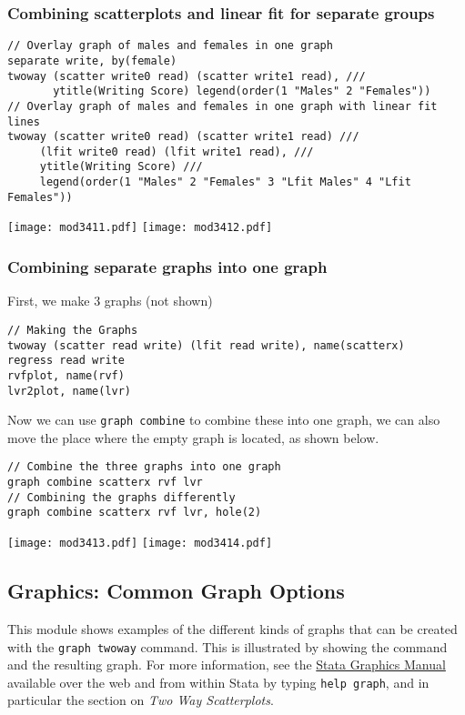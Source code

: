 \subsubsection{Combining scatterplots and linear fit for separate groups}

\begin{lstlisting}
// Overlay graph of males and females in one graph
separate write, by(female)
twoway (scatter write0 read) (scatter write1 read), ///
       ytitle(Writing Score) legend(order(1 "Males" 2 "Females"))
// Overlay graph of males and females in one graph with linear fit lines
twoway (scatter write0 read) (scatter write1 read) ///
     (lfit write0 read) (lfit write1 read), ///
     ytitle(Writing Score) ///
     legend(order(1 "Males" 2 "Females" 3 "Lfit Males" 4 "Lfit Females"))
\end{lstlisting}
\begin{center}
\texttt{[image: mod3411.pdf]}
\texttt{[image: mod3412.pdf]}
\end{center}

\subsubsection{Combining separate graphs into one graph}
First, we make 3 graphs (not shown)
\begin{lstlisting}
// Making the Graphs
twoway (scatter read write) (lfit read write), name(scatterx)
regress read write
rvfplot, name(rvf)
lvr2plot, name(lvr)
\end{lstlisting}

Now we can use \lstinline{graph combine} to combine these into one graph, we can also move the place where the empty graph is located, as shown below.

\begin{lstlisting}
// Combine the three graphs into one graph
graph combine scatterx rvf lvr
// Combining the graphs differently
graph combine scatterx rvf lvr, hole(2)
\end{lstlisting}
\begin{center}
\texttt{[image: mod3413.pdf]}
\texttt{[image: mod3414.pdf]}
\end{center}

\subsection{Graphics: Common Graph Options}
This module shows examples of the different kinds of graphs that can be created with the \lstinline{graph twoway} command.  This is illustrated by showing the command and the resulting graph.  For more information, see the \href{http://www.stata.com/help.cgi?graph}{Stata Graphics Manual} available over the web and from within Stata by typing \lstinline{help graph}, and in particular the section on \textit{Two Way Scatterplots}.

